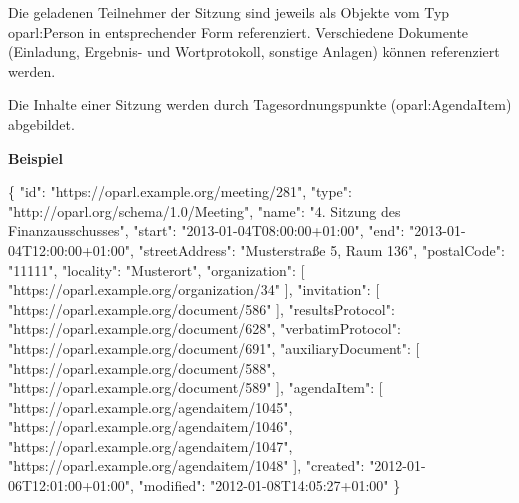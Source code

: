 \documentclass[,a4paper]{article}
\newenvironment{Shaded}{}{}
\newcommand{\DataTypeTok}[1]{\textcolor[rgb]{0.56,0.13,0.00}{{#1}}}
\newcommand{\StringTok}[1]{\textcolor[rgb]{0.25,0.44,0.63}{{#1}}}
\newcommand{\OtherTok}[1]{\textcolor[rgb]{0.00,0.44,0.13}{{#1}}}
\newcommand{\FunctionTok}[1]{\textcolor[rgb]{0.02,0.16,0.49}{{#1}}}
\begin{document}
Die geladenen Teilnehmer der Sitzung sind jeweils als Objekte vom Typ
oparl:Person in entsprechender Form referenziert. Verschiedene Dokumente
(Einladung, Ergebnis- und Wortprotokoll, sonstige Anlagen) können
referenziert werden.

Die Inhalte einer Sitzung werden durch Tagesordnungspunkte
(oparl:AgendaItem) abgebildet.

\textbf{Beispiel}

\begin{Shaded}
\begin{Highlighting}[]
\FunctionTok{\{}
    \DataTypeTok{"id"}\FunctionTok{:} \StringTok{"https://oparl.example.org/meeting/281"}\FunctionTok{,}
    \DataTypeTok{"type"}\FunctionTok{:} \StringTok{"http://oparl.org/schema/1.0/Meeting"}\FunctionTok{,}
    \DataTypeTok{"name"}\FunctionTok{:} \StringTok{"4. Sitzung des Finanzausschusses"}\FunctionTok{,}
    \DataTypeTok{"start"}\FunctionTok{:} \StringTok{"2013-01-04T08:00:00+01:00"}\FunctionTok{,}
    \DataTypeTok{"end"}\FunctionTok{:} \StringTok{"2013-01-04T12:00:00+01:00"}\FunctionTok{,}
    \DataTypeTok{"streetAddress"}\FunctionTok{:} \StringTok{"Musterstraße 5, Raum 136"}\FunctionTok{,}
    \DataTypeTok{"postalCode"}\FunctionTok{:} \StringTok{"11111"}\FunctionTok{,}
    \DataTypeTok{"locality"}\FunctionTok{:} \StringTok{"Musterort"}\FunctionTok{,}
    \DataTypeTok{"organization"}\FunctionTok{:} \OtherTok{[}
        \StringTok{"https://oparl.example.org/organization/34"}
    \OtherTok{]}\FunctionTok{,}
    \DataTypeTok{"invitation"}\FunctionTok{:} \OtherTok{[}
        \StringTok{"https://oparl.example.org/document/586"}
    \OtherTok{]}\FunctionTok{,}
    \DataTypeTok{"resultsProtocol"}\FunctionTok{:} \StringTok{"https://oparl.example.org/document/628"}\FunctionTok{,}
    \DataTypeTok{"verbatimProtocol"}\FunctionTok{:} \StringTok{"https://oparl.example.org/document/691"}\FunctionTok{,}
    \DataTypeTok{"auxiliaryDocument"}\FunctionTok{:} \OtherTok{[}
        \StringTok{"https://oparl.example.org/document/588"}\OtherTok{,}
        \StringTok{"https://oparl.example.org/document/589"}
    \OtherTok{]}\FunctionTok{,}
    \DataTypeTok{"agendaItem"}\FunctionTok{:} \OtherTok{[}
        \StringTok{"https://oparl.example.org/agendaitem/1045"}\OtherTok{,}
        \StringTok{"https://oparl.example.org/agendaitem/1046"}\OtherTok{,}
        \StringTok{"https://oparl.example.org/agendaitem/1047"}\OtherTok{,}
        \StringTok{"https://oparl.example.org/agendaitem/1048"}
    \OtherTok{]}\FunctionTok{,}
    \DataTypeTok{"created"}\FunctionTok{:} \StringTok{"2012-01-06T12:01:00+01:00"}\FunctionTok{,}
    \DataTypeTok{"modified"}\FunctionTok{:} \StringTok{"2012-01-08T14:05:27+01:00"}
\FunctionTok{\}}
\end{Highlighting}
\end{Shaded}
\end{document}
